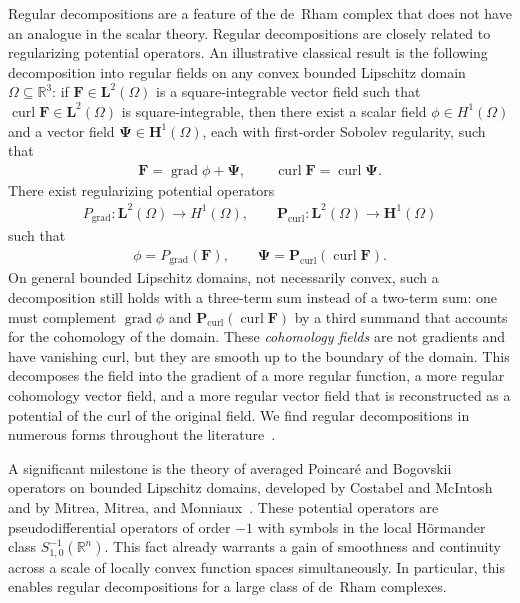 \documentclass[10pt,a4paper]{amsart}
\theoremstyle{definition}
\theoremstyle{remark}
\numberwithin{equation}{section}
\newcommand{\bbR}{{\mathbb R}}
\newcommand{\bfF}{{\mathbf F}}
\newcommand{\bfH}{{\mathbf H}}
\newcommand{\bfL}{{\mathbf L}}
\newcommand{\bfP}{{\mathbf P}}
\newcommand{\boldPsi}{\boldsymbol{\Psi}}
\newcommand{\Domain}{{\Omega}}
\newcommand{\grad}{\operatorname{grad}}
\newcommand{\curl}{\operatorname{curl}}
\begin{document}
Regular decompositions are a feature of the de~Rham complex that does not have an analogue in the scalar theory. 
Regular decompositions are closely related to regularizing potential operators. 
An illustrative classical result is the following decomposition into regular fields on any convex bounded Lipschitz domain $\Domain \subseteq \bbR^{3}$:
if $\bfF \in \bfL^{2}(\Domain)$ is a square-integrable vector field such that $\curl \bfF \in \bfL^{2}(\Domain)$ is square-integrable,
then there exist a scalar field $\phi \in H^{1}(\Domain)$ and a vector field $\boldPsi \in \bfH^{1}(\Domain)$,
each with first-order Sobolev regularity, such that 
\begin{align*}
    \bfF = \grad \phi + \boldPsi, \qquad \curl \bfF = \curl \boldPsi.
\end{align*}
There exist regularizing potential operators 
\begin{gather*}
    P_{\grad} : \bfL^{2}(\Domain) \to H^{1}(\Domain), \qquad \bfP_{\curl} : \bfL^{2}(\Domain) \to \bfH^{1}(\Domain)
\end{gather*}
such that 
\begin{align*}
    \phi = P_{\grad}( \bfF ), \qquad \boldPsi = \bfP_{\curl}( \curl \bfF ).
\end{align*}
On general bounded Lipschitz domains, not necessarily convex, such a decomposition still holds with a three-term sum instead of a two-term sum:
one must complement $\grad \phi$ and $\bfP_{\curl}( \curl \bfF )$ by a third summand that accounts for the cohomology of the domain.
These \emph{cohomology fields} are not gradients and have vanishing curl, but they are smooth up to the boundary of the domain.
This decomposes the field into the gradient of a more regular function, a more regular cohomology vector field, and a more regular vector field that is reconstructed as a potential of the curl of the original field.
We find regular decompositions in numerous forms throughout the literature~\cite{amrouche1994decomposition,amrouche1998vector,hiptmair2007nodal,bauer2016maxwell,gopalakrishnan2018auxiliary,hiptmair2019discrete,bauer2019weck,pauly2022hilbert,zbMATH07859130}. 

A significant milestone is the theory of averaged Poincar\'e and Bogovskii operators on bounded Lipschitz domains, 
developed by Costabel and McIntosh~\cite{costabel2010} and by Mitrea, Mitrea, and Monniaux~\cite{mitrea2008poisson}. 
These potential operators are pseudodifferential operators of order $-1$ with symbols in the local H\"ormander class $S^{-1}_{1,0}(\bbR^{n})$. 
This fact already warrants a gain of smoothness and continuity across a scale of locally convex function spaces simultaneously. 
In particular, this enables regular decompositions for a large class of de~Rham complexes. 
\end{document}
